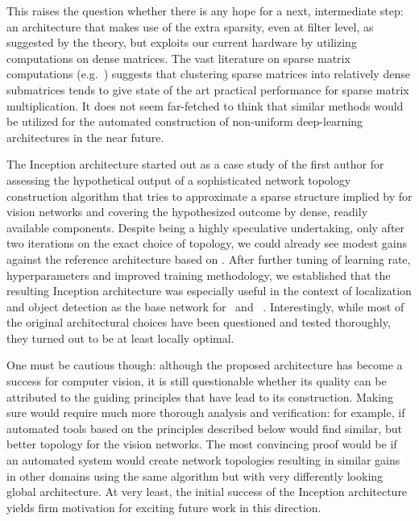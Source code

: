 This raises the question whether there is any hope for a next, intermediate step: an architecture that makes use of the extra sparsity, even at filter level, as suggested by the theory, but exploits our current hardware by utilizing computations on dense matrices. The vast literature on sparse matrix computations (e.g.~\cite{catalyurek2010sparse}) suggests that clustering sparse matrices into relatively dense submatrices tends to give state of the art practical performance for sparse matrix multiplication. It does not seem far-fetched to think that similar methods would be utilized for the automated construction of non-uniform deep-learning architectures in the near future.

The Inception architecture started out as a case study of the first author for assessing the hypothetical output of a sophisticated network topology construction algorithm that tries to approximate a sparse structure implied by \cite{arora2013bounds} for vision networks and covering the hypothesized outcome by dense, readily available components. Despite being a highly speculative undertaking, only after two iterations on the exact choice of topology, we could already see modest gains against the reference architecture based on \cite{lin2013nin}. After further tuning of learning rate, hyperparameters and improved training methodology, we established that the resulting Inception architecture was especially useful in the context of localization and object detection as the base network for~\cite{girshick2014rich} and ~\cite{erhan2014scalable}. Interestingly, while most of the original architectural choices have been questioned and tested thoroughly, they turned out to be at least locally optimal.

One must be cautious though: although the proposed architecture has become a success for computer vision, it is still questionable whether its quality can be attributed to the guiding principles that have lead to its construction. Making sure would require much more thorough analysis and verification: for example, if automated tools based on the principles described below would find similar, but better topology for the vision networks. The most convincing proof would be if an automated system would create network topologies resulting in similar gains in other domains using the same algorithm but with very differently looking global architecture. At very least, the initial success of the Inception architecture yields firm motivation for exciting future work in this direction.
